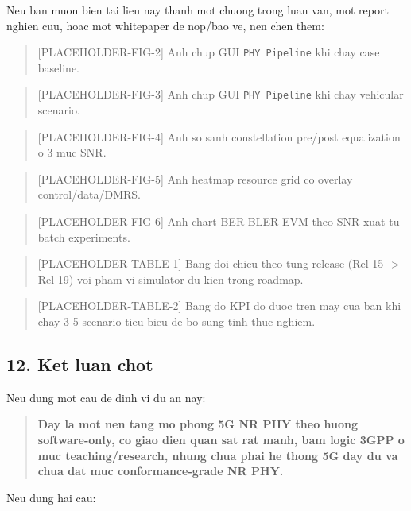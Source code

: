 \documentclass[
  vietnamese,
  a4paper,
  11pt]{article}
\begin{document}
Neu ban muon bien tai lieu nay thanh mot chuong trong luan van, mot
report nghien cuu, hoac mot whitepaper de nop/bao ve, nen chen them:

\begin{quote}
{[}PLACEHOLDER-FIG-2{]} Anh chup GUI \texttt{PHY\ Pipeline} khi chay
case baseline.
\end{quote}

\begin{quote}
{[}PLACEHOLDER-FIG-3{]} Anh chup GUI \texttt{PHY\ Pipeline} khi chay
vehicular scenario.
\end{quote}

\begin{quote}
{[}PLACEHOLDER-FIG-4{]} Anh so sanh constellation pre/post equalization
o 3 muc SNR.
\end{quote}

\begin{quote}
{[}PLACEHOLDER-FIG-5{]} Anh heatmap resource grid co overlay
control/data/DMRS.
\end{quote}

\begin{quote}
{[}PLACEHOLDER-FIG-6{]} Anh chart BER-BLER-EVM theo SNR xuat tu batch
experiments.
\end{quote}

\begin{quote}
{[}PLACEHOLDER-TABLE-1{]} Bang doi chieu theo tung release (Rel-15
-\textgreater{} Rel-19) voi pham vi simulator du kien trong roadmap.
\end{quote}

\begin{quote}
{[}PLACEHOLDER-TABLE-2{]} Bang do KPI do duoc tren may cua ban khi chay
3-5 scenario tieu bieu de bo sung tinh thuc nghiem.
\end{quote}

\subsection{12. Ket luan chot}\label{ket-luan-chot}

Neu dung mot cau de dinh vi du an nay:

\begin{quote}
\textbf{Day la mot nen tang mo phong 5G NR PHY theo huong software-only,
co giao dien quan sat rat manh, bam logic 3GPP o muc teaching/research,
nhung chua phai he thong 5G day du va chua dat muc conformance-grade NR
PHY.}
\end{quote}

Neu dung hai cau:
\end{document}
